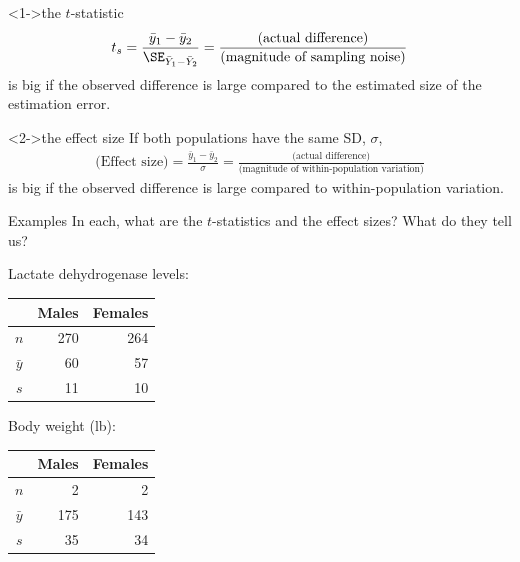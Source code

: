 \begin{frame}{}

    \begin{block}<1->{the $t$-statistic}
        \begin{align*}
            t_s = \frac{\bar y_1 - \bar y_2}{ \SE_{\bar Y_1 - \bar Y_2} } 
            = \frac{ \text{(actual difference)} }{ \text{(magnitude of sampling noise)} }
        \end{align*}
        is big if the observed difference is large compared to the estimated size of the \alert{estimation error}.
    \end{block}

    \begin{block}<2->{the effect size}
        If both populations have the same SD, $\sigma$,
        \begin{align*}
            \text{(Effect size)} = \frac{\bar y_1 - \bar y_2}{ \sigma }
            = \frac{ \text{(actual difference)} }{ \text{(magnitude of within-population variation)} }
        \end{align*}
        is big if the observed difference is large compared to \alert{within-population variation}.
    \end{block}

\end{frame}

\begin{frame}{Examples}
    In each, 
    what are the $t$-statistics
    and the effect sizes?
    What do they tell us?

  \vfill

  Lactate dehydrogenase levels:
  \begin{center}
    \begin{tabular}{crr}
       & Males & Females \\
       \hline
       $n$ & 270 & 264 \\
       $\bar y$ & 60 & 57 \\
       $s$ & 11 & 10
     \end{tabular}
  \end{center}
  
  \vfill

  Body weight (lb):
  \begin{center}
    \begin{tabular}{crr}
       & Males & Females \\
       \hline
       $n$ & 2 & 2 \\
       $\bar y$ & 175 & 143 \\
       $s$ & 35 & 34
     \end{tabular}
 \end{center}

\end{frame}


